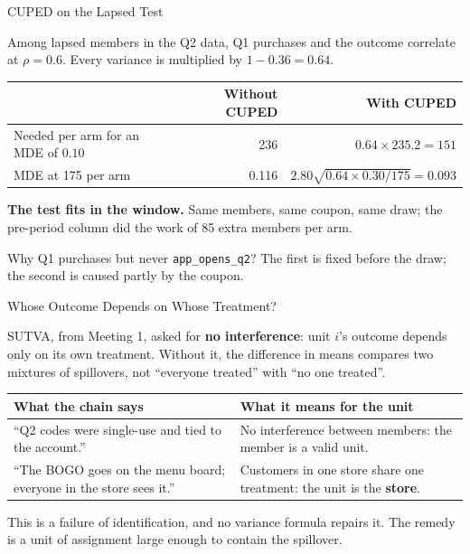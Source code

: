 \documentclass[aspectratio=169, 11pt, handout]{beamer}
\begin{document}
\begin{frame}{CUPED on the Lapsed Test}

Among lapsed members in the Q2 data, Q1 purchases and the outcome correlate at $\rho = 0.6$. Every variance is multiplied by $1 - 0.36 = 0.64$.

\begin{center}
\begin{tabular}{lrr}
\toprule
& \textbf{Without CUPED} & \textbf{With CUPED} \\
\midrule
Needed per arm for an MDE of $0.10$ & 236 & $0.64 \times 235.2 = 151$ \\
MDE at 175 per arm & 0.116 & $2.80\sqrt{0.64 \times 0.30/175} = 0.093$ \\
\bottomrule
\end{tabular}
\end{center}

\bigskip

\textcolor{sbgreen}{\textbf{The test fits in the window.}} Same members, same coupon, same draw; the pre-period column did the work of 85 extra members per arm.

\bigskip

\small Why Q1 purchases but never \texttt{app\_opens\_q2}? The first is fixed before the draw; the second is caused partly by the coupon.
\end{frame}

\begin{frame}{Whose Outcome Depends on Whose Treatment?}

SUTVA, from Meeting 1, asked for \textbf{no interference}: unit $i$'s outcome depends only on its own treatment. Without it, the difference in means compares two mixtures of spillovers, not ``everyone treated'' with ``no one treated''.

\begin{center}
\small
\begin{tabular}{p{6.2cm}p{6.6cm}}
\toprule
\textbf{What the chain says} & \textbf{What it means for the unit} \\
\midrule
``Q2 codes were single-use and tied to the account.'' & No interference between members: the member is a valid unit. \\[0.4em]
``The BOGO goes on the menu board; everyone in the store sees it.'' & Customers in one store share one treatment: the unit is the \textbf{store}. \\
\bottomrule
\end{tabular}
\end{center}

\bigskip

This is a failure of identification, and no variance formula repairs it. The remedy is a unit of assignment large enough to contain the spillover.
\end{frame}
\end{document}
